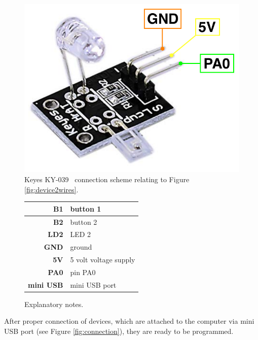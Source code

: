 \documentclass[11pt,a4paper]{article}
\begin{document}
\begin{figure}[H]
    \centering
    \includegraphics[scale=0.5]{img/sensor1-wires.pdf}
    \caption{Keyes KY-039~\cite{IMG-SENSOR-1} connection scheme relating to Figure \ref{fig:device2wires}.}
    \label{fig:senzor2wires}
\end{figure}

\begin{figure}[H]
    \begin{center}
        \begin{tabular}{|r|l|}
            \hline
            \textbf{B1} & button 1 \\
            \hline
            \textbf{B2} & button 2 \\
            \hline
            \textbf{LD2} & LED 2 \\
            \hline
            \textbf{GND} & ground \\
            \hline
            \textbf{5V} & 5 volt voltage supply \\
            \hline
            \textbf{PA0} & pin PA0 \\
            \hline
            \textbf{mini USB} & mini USB port \\
            \hline
        \end{tabular}
    \end{center}
    \caption{Explanatory notes.}
    \label{fig:legend}
\end{figure}

After proper connection of devices, which are attached to the computer via mini USB port (see Figure \ref{fig:connection}), they are ready to be programmed.
\end{document}
